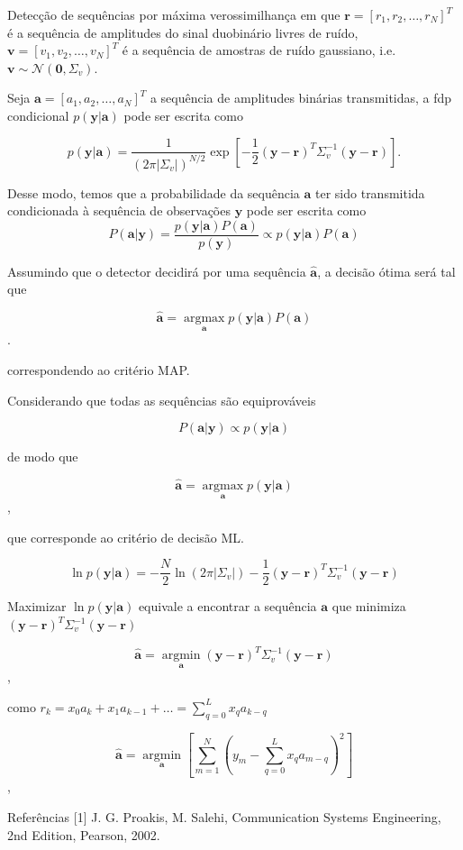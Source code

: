 \documentclass[
  ignorenonframetext,
]{beamer}
\begin{document}
\begin{frame}{Detecção de sequências por máxima verossimilhança}
em que \(\boldsymbol{r} = [r_1, r_2, \dots, r_N]^T\) é a sequência de
amplitudes do sinal duobinário livres de ruído,
\(\boldsymbol{v} = [v_1, v_2, \dots, v_N]^T\) é a sequência de amostras
de ruído gaussiano,
i.e.~\(\boldsymbol{v}\sim \mathcal{N}(\mathbf{0}, \Sigma_v)\).

Seja \(\boldsymbol{a} = [a_1, a_2, \dots, a_N]^T\) a sequência de
amplitudes binárias transmitidas, a fdp condicional
\(p(\boldsymbol{y}|\boldsymbol{a})\) pode ser escrita como

\[
p(\boldsymbol{y}|\boldsymbol{a}) = \frac{1}{(2\pi |\Sigma_v|)^{N/2}} \exp \left[-\frac{1}{2} (\boldsymbol{y}-\boldsymbol{r})^T \Sigma_v^{-1} (\boldsymbol{y}-\boldsymbol{r}) \right].
\]

Desse modo, temos que a probabilidade da sequência \(\boldsymbol{a}\)
ter sido transmitida condicionada à sequência de observações
\(\boldsymbol{y}\) pode ser escrita como \[
P(\boldsymbol{a}|\boldsymbol{y}) = \frac{p(\boldsymbol{y}|\boldsymbol{a})P(\boldsymbol{a})}{p(\boldsymbol{y})} \propto p(\boldsymbol{y}|\boldsymbol{a})P(\boldsymbol{a})
\]

Assumindo que o detector decidirá por uma sequência
\(\boldsymbol{\hat{a}}\), a decisão ótima será tal que

\[\boldsymbol{\hat{a}} = \underset{\boldsymbol{a}}{\operatorname{argmax}} p(\boldsymbol{y}|\boldsymbol{a})P(\boldsymbol{a})\].

correspondendo ao critério MAP.

Considerando que todas as sequências são equiprováveis

\[
P(\boldsymbol{a}|\boldsymbol{y}) \propto p(\boldsymbol{y}|\boldsymbol{a})
\]

de modo que

\[\boldsymbol{\hat{a}} = \underset{\boldsymbol{a}}{\operatorname{argmax}} p(\boldsymbol{y}|\boldsymbol{a})\],

que corresponde ao critério de decisão ML.

\[
\ln p(\boldsymbol{y}|\boldsymbol{a}) = -\frac{N}{2}\ln(2\pi |\Sigma_v|) -\frac{1}{2} (\boldsymbol{y}-\boldsymbol{r})^T \Sigma_v^{-1} (\boldsymbol{y}-\boldsymbol{r})
\]

Maximizar \(\ln p(\boldsymbol{y}|\boldsymbol{a})\) equivale a encontrar
a sequência \(\boldsymbol{a}\) que minimiza
\((\boldsymbol{y}-\boldsymbol{r})^T \Sigma_v^{-1} (\boldsymbol{y}-\boldsymbol{r})\)

\[\boldsymbol{\hat{a}} = \underset{\boldsymbol{a}}{\operatorname{argmin}} (\boldsymbol{y}-\boldsymbol{r})^T \Sigma_v^{-1} (\boldsymbol{y}-\boldsymbol{r})\],

como \(r_k =x_0a_k + x_1a_{k-1} + \dots =  \sum_{q=0}^{L}x_qa_{k-q}\)

\[\boldsymbol{\hat{a}} = \underset{\boldsymbol{a}}{\operatorname{argmin}} \left[ \sum_{m=1}^{N}\left(y_m - \sum_{q=0}^{L}x_qa_{m-q}\right)^2\right]\],
\end{frame}

\begin{frame}{Referências}
\label{referuxeancias}
{[}1{]} J. G. Proakis, M. Salehi, Communication Systems Engineering, 2nd
Edition, Pearson, 2002.
\end{frame}
\end{document}
